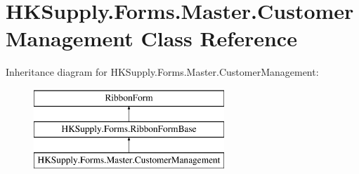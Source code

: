 \hypertarget{class_h_k_supply_1_1_forms_1_1_master_1_1_customer_management}{}\section{H\+K\+Supply.\+Forms.\+Master.\+Customer\+Management Class Reference}
\label{class_h_k_supply_1_1_forms_1_1_master_1_1_customer_management}
Inheritance diagram for H\+K\+Supply.\+Forms.\+Master.\+Customer\+Management\+:\begin{figure}[H]
\begin{center}
\leavevmode
\includegraphics[height=3.000000cm]{class_h_k_supply_1_1_forms_1_1_master_1_1_customer_management}
\end{center}
\end{figure}
